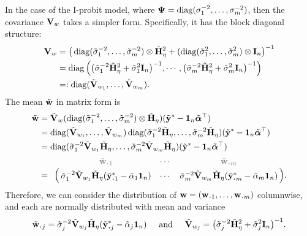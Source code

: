 In the case of the I-probit model, where ${\bm\Psi} = \operatorname{diag}(\sigma_1^{-2},\dots,\sigma_m^{-2})$, then the covariance ${\mathbf V}_w$ takes a simpler form.
Specifically, it has the block diagonal structure:
\begin{align*}
  {\mathbf V}_w 
  &= \big(\operatorname{diag}(\tilde\sigma_1^{-2},\dots,\tilde\sigma_m^{-2}) \otimes \tilde{{\mathbf H}}_\eta^2 + (\operatorname{diag}(\tilde\sigma_1^{2},\dots,\tilde\sigma_m^{2}) \otimes {\mathbf I}_n \big)^{-1} \\
  &= \operatorname{diag}\Big(
  \big(\tilde\sigma_1^{-2}\tilde{{\mathbf H}}_\eta^2 + \tilde\sigma_1^2{\mathbf I}_n\big)^{-1},
  \cdots,
  \big(\tilde\sigma_m^{-2}\tilde{{\mathbf H}}_\eta^2 + \tilde\sigma_m^2{\mathbf I}_n\big)^{-1}
  \Big) \\
  &=: \operatorname{diag}(\tilde{{\mathbf V}}_{w_1},\dots,\tilde{{\mathbf V}}_{w_m}).
  \end{align*}
The mean $\tilde{{\mathbf w}}$ in matrix form is
\begin{align*}
  \tilde\bw 
  &= \tilde\bV_w (\diag(\tilde\sigma_1^{-2},\dots,\tilde\sigma_m^{-2}) \otimes \tilde\bH_\eta) (\tilde\by^* - \bone_n\tilde\balpha^\top) \\
  &= \diag(\tilde\bV_{w_1},\dots,\tilde\bV_{w_m})
  \diag(\tilde\sigma_1^{-2}\tilde\bH_\eta,\dots,\tilde\sigma_m^{-2}\tilde\bH_\eta)  
  (\tilde\by^* - \bone_n\tilde\balpha^\top) \\
  &= \diag(\tilde\sigma_1^{-2}\tilde\bV_{w_1}\tilde\bH_\eta,\dots,\tilde\sigma_m^{-2}\tilde\bV_{w_m}\tilde\bH_\eta)  
  (\tilde\by^* - \bone_n\tilde\balpha^\top) \\
  &= 
  \bordermatrix{
  &\color{gray}\tilde\bw_{\bigcdot 1} 
  &\color{gray}\cdots 
  &\color{gray}\tilde\bw_{\bigcdot m} \cr
  &\tilde\sigma_1^{-2}\tilde\bV_{w_{1}}\tilde\bH_\eta(\tilde\by^*_{\bigcdot 1} - \tilde\alpha_1\bone_n)      
  &\cdots 
  &\tilde\sigma_m^{-2}\tilde\bV_{w_{m}}\tilde\bH_\eta(\tilde\by^*_{\bigcdot m} - \tilde\alpha_m\bone_n) 
  }.
\end{align*}
Therefore, we can consider the distribution of $\bw = (\bw_{\bigcdot 1},\dots,\bw_{\bigcdot m})$ columnwise, and each are normally distributed with mean and variance
\[
  \tilde\bw_{\bigcdot j} = \tilde\sigma_j^{-2}\tilde\bV_{w_{j}}\tilde\bH_\eta(\tilde\by^*_{\bigcdot j} - \tilde\alpha_j\bone_n) 
  \hspace{0.5cm}\text{and}\hspace{0.5cm}
  \tilde\bV_{w_{j}} = \big(\tilde\sigma_j^{-2}\tilde\bH_\eta^2 + \tilde\sigma_j^2\bI_n\big)^{-1}.
\]

